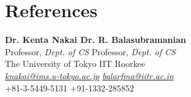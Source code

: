 \documentclass[]{durgesh_resume}
\begin{document}
\begin{minipage}[t]{0.66\textwidth}

\section{References} 
\renewcommand\refname{\vskip -1.5em} %
\textbf {Dr. Kenta Nakai \hfill Dr. R. Balasubramanian }\\
\normalsize Professor, \textit {Dept. of CS} \hfill Professor, \textit {Dept. of CS} \\
The University of Tokyo \hfill IIT Roorkee \\
\href{mailto:knakai@ims.u-tokyo.ac.jp}{\textit{knakai@ims.u-tokyo.ac.jp}} \hfill  \href{mailto:balarfma@iitr.ac.in}{\textit{balarfma@iitr.ac.in}}\\
\small +81-3-5449-5131 \hfill +91-1332-285852 \\

\end{minipage} 
\end{document}
